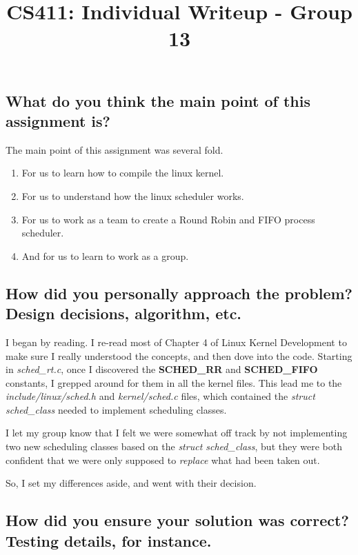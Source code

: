 \documentclass[letterpaper,10pt,titlepage]{article}
\title{CS411: Individual Writeup - Group 13}
\date{}
\author{\name}
\begin{document}
\maketitle

\subsection*{What do you think the main point of this assignment is?}

The main point of this assignment was several fold.

    \begin{enumerate}
        \item For us to learn how to compile the linux kernel.
        \item For us to understand how the linux scheduler works.
        \item For us to work as a team to create a Round Robin and FIFO
            process scheduler.
        \item And for us to learn to work as a group.
    \end{enumerate}

\subsection*{How did you personally approach the problem? Design
decisions, algorithm, etc.}

I began by reading. I re-read most of Chapter 4 of Linux Kernel
Development to make sure I really understood the concepts, and then dove
into the code. Starting in \emph{sched\_rt.c}, once I discovered the
\textbf{SCHED\_RR} and \textbf{SCHED\_FIFO} constants, I grepped around
for them in all the kernel files. This lead me to the
\emph{include/linux/sched.h} and
\emph{kernel/sched.c} files, which contained the \emph{struct
sched\_class} needed to implement scheduling classes.

I let my group know that I felt we were somewhat off track by not
implementing two new scheduling classes based on the
\emph{struct sched\_class}, but they were both confident that we were
only supposed to \emph{replace} what had been taken out.

So, I set my differences aside, and went with their decision.

\subsection*{How did you ensure your solution was correct? Testing
details, for instance.}
\end{document}
